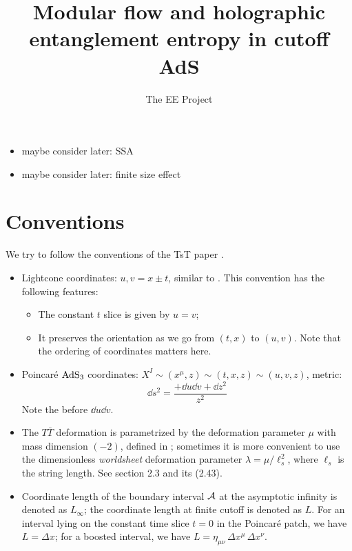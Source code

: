 \documentclass[11pt,a4paper,utf8]{article}
\title{Modular flow and holographic entanglement entropy in cutoff AdS}
\author[a]{The EE \TTbar Project}
\affiliation[a]{Yau Mathematical Sciences Center, Tsinghua University, Beijing 100084, China\ \,\normalsize\ccbyncsajp}
\newcommand{\TTbar}{\ensuremath{T\bar{T}}\xspace}
\begin{document}
\maketitle

\setlength{\parskip}{.5\baselineskip}

\addtocounter{section}{-1}
\begin{itemize}[nosep]
\item maybe consider later: SSA 
\item maybe consider later: finite size effect  
\end{itemize}

\pagebreak
\section{Conventions}
	We try to follow the conventions of the TsT paper \textcite{Apolo:2019zai}. 
	\begin{itemize}
	\item Lightcone coordinates: $u,v = x\pm t$, similar to \cite{Apolo:2019zai}. This convention has the following features:
	
		\begin{itemize}
		\item The constant $t$ slice is given by $u = v$;
		\item It preserves the orientation as we go from $(t,x)$ to $(u,v)$. Note that the ordering of coordinates matters here.
		\end{itemize}
	
	\item Poincar\'e $\mathrm{AdS}_3$ coordinates: $
			X^I \sim (x^\mu,z) \sim (t,x,z) \sim (u,v,z)
		$, metric: 
	\begin{equation}
		\dd{s}^2
		= \frac{+\dd{u} \dd{v} + \dd{z}^2}{z^2}
	\end{equation}
	Note the \mquote{+} before $\dd{u} \dd{v}$. 
	
	\item The \TTbar deformation is parametrized by the deformation parameter $\mu$ with mass dimension $(-2)$, defined in \cite{Apolo:2019zai}; sometimes it is more convenient to use the dimensionless \textit{worldsheet} deformation parameter $\lambda = \mu/\ell_s^2$, where $\ell_s$ is the string length. See \cite{Apolo:2019zai} section 2.3 and its (2.43). 
	
	\item Coordinate length of the boundary interval $\mathcal{A}$ at the asymptotic infinity is denoted as $L_\infty$; the coordinate length at finite cutoff is denoted as $L$. For an interval lying on the constant time slice $t = 0$ in the Poincar\'e patch, we have $L = \Delta x$; for a boosted interval, we have $
		L = \eta_{\mu\nu}\, \Delta x^\mu\, \Delta x^\nu
	$. 
	\end{itemize}
	
\end{document}
